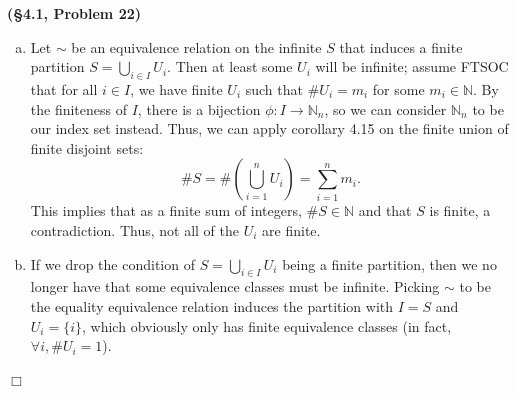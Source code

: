 \documentclass[12pt]{article}
\theoremstyle{definition}
\newenvironment{Solution}{\noindent {\sc Solution.}}{$\Box$ \vspace{2 ex}}
\begin{document}
\begin{Solution}
{\bf (\S4.1, Problem 22)}\\
\begin{enumerate}[(a)]
\item Let $\sim$ be an equivalence relation on the infinite $S$ that induces a finite partition $S = \bigcup_{i \in I} U_i$. Then at least some $U_i$ will be infinite; assume FTSOC that for all $i \in I$, we have finite $U_i$ such that $\# U_i = m_i$ for some $m_i \in \mathbb N$. By the finiteness of $I$, there is a bijection $\phi : I \to \mathbb N_n$, so we can consider $\mathbb N_n$ to be our index set instead. Thus, we can apply corollary 4.15 on the finite union of finite disjoint sets:
\[
    \# S = \# \left(\bigcup_{i=1}^n U_i\right) = \sum_{i=1}^n m_i.
\]
This implies that as a finite sum of integers, $\# S \in \mathbb N$ and that $S$ is finite, a contradiction. Thus, not all of the $U_i$ are finite.

\item If we drop the condition of $S = \bigcup_{i\in I} U_i$ being a finite partition, then we no longer have that some equivalence classes must be infinite. Picking $\sim$ to be the equality equivalence relation induces the partition with $I=S$ and $U_i = \{ i\}$, which obviously only has finite equivalence classes (in fact, $\forall i, \# U_i = 1$).
\end{enumerate}
\end{Solution}

\vspace{0.5cm}
\end{document}
